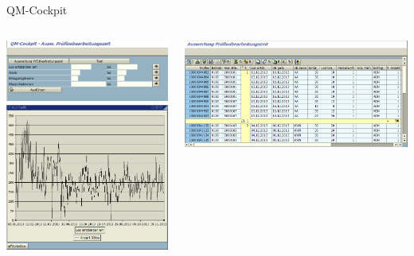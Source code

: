 \begin{frame}{QM-Cockpit}
	\begin{columns}
		\begin{column}{.5\textwidth}
			\centering
 			\includegraphics[width=.95\textwidth]{images/QMCockpit1.png}
			\\[2.1ex]
 			\includegraphics[width=.95\textwidth]{images/QMCockpit3.png}
		\end{column}
		\begin{column}{.5\textwidth}
			\centering
 			\includegraphics[width=.95\textwidth]{images/QMCockpit2.png}

\end{column}
\end{columns}
\end{frame}
